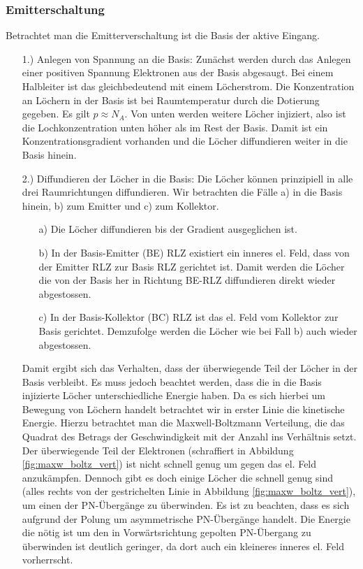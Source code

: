 \documentclass[12pt,a4paper]{report}%
\numberwithin{equation}{section}
\numberwithin{equation}{subsection}
\begin{document}
    \subsubsection{Emitterschaltung}
     Betrachtet man die Emitterverschaltung ist die Basis der aktive Eingang.
    \begin{itemize}
      \item[1.) ] Anlegen von Spannung an die Basis: \newline
        Zunächst werden durch das Anlegen einer positiven Spannung Elektronen aus der Basis abgesaugt. Bei einem Halbleiter ist das gleichbedeutend mit einem Löcherstrom. Die Konzentration an Löchern in der Basis ist bei Raumtemperatur durch die Dotierung gegeben. Es gilt $p \approx N_A$. Von unten werden weitere Löcher injiziert, also ist die Lochkonzentration unten höher als im Rest der Basis. Damit ist ein Konzentrationsgradient vorhanden und die Löcher diffundieren weiter in die Basis hinein. 
        \item[2.) ] Diffundieren der Löcher in die Basis: \newline
        Die Löcher können prinzipiell in alle drei Raumrichtungen diffundieren. Wir betrachten die Fälle a) in die Basis hinein, b) zum Emitter und c) zum Kollektor. 
        \begin{itemize}
          \item[a) ] Die Löcher diffundieren bis der Gradient ausgeglichen ist. 
          \item[b) ] In der Basis-Emitter (BE) RLZ existiert ein inneres el. Feld, dass von der Emitter RLZ zur Basis RLZ gerichtet ist. Damit werden die Löcher die von der Basis her in Richtung BE-RLZ diffundieren direkt wieder abgestossen.
          \item[c) ] In der Basis-Kollektor (BC) RLZ ist das el. Feld vom Kollektor zur Basis gerichtet. Demzufolge werden die Löcher wie bei Fall b) auch wieder abgestossen.
        \end{itemize}
        Damit ergibt sich das Verhalten, dass der überwiegende Teil der Löcher in der Basis verbleibt. \newline
        Es muss jedoch beachtet werden, dass die in die Basis injizierte Löcher unterschiedliche Energie haben. Da es sich hierbei um Bewegung von Löchern handelt betrachtet wir in erster Linie die kinetische Energie. Hierzu betrachtet man die Maxwell-Boltzmann Verteilung, die das Quadrat des Betrags der Geschwindigkeit mit der Anzahl ins Verhältnis setzt. Der überwiegende Teil der Elektronen (schraffiert  in Abbildung \ref{fig:maxw_boltz_vert}) ist nicht schnell genug um gegen das el. Feld anzukämpfen. Dennoch gibt es doch einige Löcher die schnell genug sind (alles rechts von der gestrichelten Linie in Abbildung \ref{fig:maxw_boltz_vert}), um einen der PN-Übergänge zu überwinden. Es ist zu beachten, dass es sich aufgrund der Polung um asymmetrische PN-Übergänge handelt. Die Energie die nötig ist um den in Vorwärtsrichtung gepolten PN-Übergang zu überwinden ist deutlich geringer, da dort auch ein kleineres inneres el. Feld vorherrscht.

\end{itemize}
\end{document}
